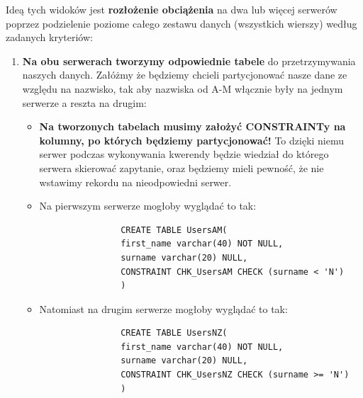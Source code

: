\documentclass[a4paper]{article}
\begin{document}
    Ideą tych widoków jest \textbf{rozłożenie obciążenia} na dwa lub więcej serwerów poprzez podzielenie poziome
    całego zestawu danych (wszystkich wierszy) według zadanych kryteriów:
    \begin{enumerate}
        \item \textbf{Na obu serwerach tworzymy odpowiednie tabele} do przetrzymywania naszych danych. Załóżmy że
        będziemy chcieli partycjonować nasze dane ze względu na nazwisko, tak aby nazwiska od A-M włącznie
        były na jednym serwerze a reszta na drugim:
        \begin{itemize}[noitemsep]
            \item \textbf{Na tworzonych tabelach musimy założyć CONSTRAINTy na kolumny, po których będziemy
            partycjonować!} To dzięki niemu serwer podczas wykonywania kwerendy będzie wiedział do którego serwera
            skierować zapytanie, oraz będziemy mieli pewność, że nie wstawimy rekordu na nieodpowiedni serwer.
            \item Na pierwszym serwerze mogłoby wyglądać to tak:
            \begin{verbatim}
                CREATE TABLE UsersAM(
                first_name varchar(40) NOT NULL,
                surname varchar(20) NULL,
                CONSTRAINT CHK_UsersAM CHECK (surname < 'N')
                )
            \end{verbatim}
        \end{itemize}
        \begin{itemize}[noitemsep]
            \item Natomiast na drugim serwerze mogłoby wyglądać to tak:
            \begin{verbatim}
                CREATE TABLE UsersNZ(
                first_name varchar(40) NOT NULL,
                surname varchar(20) NULL,
                CONSTRAINT CHK_UsersNZ CHECK (surname >= 'N')
                )
            \end{verbatim}
        \end{itemize}


\end{enumerate}
\end{document}

